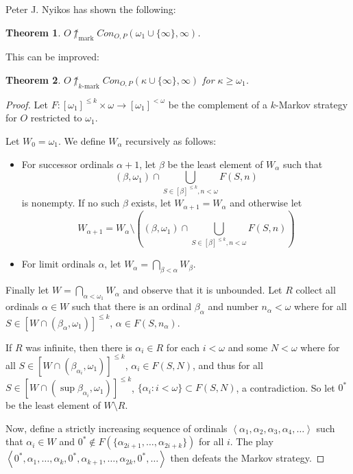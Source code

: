 \documentclass[11pt]{article}
\theoremstyle{plain}
\newtheorem{theorem}{Theorem}
\theoremstyle{definition}
\theoremstyle{remark}
\newcommand{\markwin}{\uparrow_{\text{mark}}}
\newcommand{\kmarkwin}[1]{\uparrow_{#1\text{-mark}}}
\begin{document}
Peter J. Nyikos has shown the following:

\begin{theorem}
$O\not\markwin Con_{O,P}(\omega_1\cup\{\infty\},\infty)$.
\end{theorem}

This can be improved:

\begin{theorem}
$O\not\kmarkwin{k} Con_{O,P}(\kappa\cup\{\infty\},\infty)$ for $\kappa\geq\omega_1$.
\end{theorem}

\begin{proof}
Let $F:[\omega_1]^{\leq k}\times\omega\to[\omega_1]^{<\omega}$ be the complement of a $k$-Markov strategy for $O$ restricted to $\omega_1$.

Let $W_0=\omega_1$. We define $W_\alpha$ recursively as follows:
    \begin{itemize}
    \item For successor ordinals $\alpha+1$, let $\beta$ be the least element of $W_\alpha$ such that \[(\beta,\omega_1) \cap \bigcup_{S\in [\beta]^{\leq k}, n<\omega} F(S,n)\] is nonempty. If no such $\beta$ exists, let $W_{\alpha+1}=W_\alpha$ and otherwise let \[W_{\alpha+1}=W_\alpha \setminus \left((\beta,\omega_1) \cap \bigcup_{S\in[\beta]^{\leq k}, n<\omega} F(S,n)\right)\]
    \item For limit ordinals $\alpha$, let $W_\alpha = \bigcap_{\beta<\alpha} W_\beta$.
    \end{itemize}

Finally let $W=\bigcap_{\alpha<\omega_1}W_\alpha$ and observe that it is unbounded. Let $R$ collect all ordinals $\alpha\in W$ such that there is an ordinal $\beta_\alpha$ and number $n_\alpha<\omega$ where for all $S\in[W\cap(\beta_\alpha,\omega_1)]^{\leq k}$, $\alpha \in F(S,n_\alpha)$.

If $R$ was infinite, then there is $\alpha_i\in R$ for each $i<\omega$ and some $N<\omega$ where for all $S\in[W\cap(\beta_{\alpha_i},\omega_1)]^{\leq k}$, $\alpha_i \in F(S,N)$, and thus for all $S\in[W\cap(\sup \beta_{\alpha_i},\omega_1)]^{\leq k}$,  $\{\alpha_i : i<\omega\} \subset F(S,N)$, a contradiction. So let $0^*$ be the least element of $W\setminus R$.

Now, define a strictly increasing sequence of ordinals $\left<\alpha_1,\alpha_2,\alpha_3,\alpha_4,\dots\right>$ such that $\alpha_i \in W$ and $0^* \not\in F(\{\alpha_{2i+1},\dots,\alpha_{2i+k}\})$ for all $i$. The play $\left<0^*,\alpha_1,\dots,\alpha_k,0^*,\alpha_{k+1},\dots,\alpha_{2k},0^*,\dots\right>$ then defeats the Markov strategy.
\end{proof}
\end{document}
